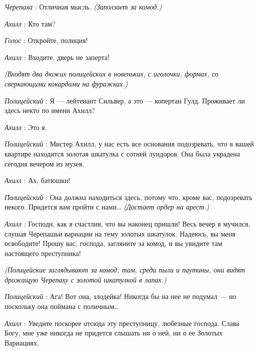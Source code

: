 \emph{Черепаха} : Отличная мысль. \emph{(Заползает за комод.)}

\emph{Ахилл} : Кто там?

\emph{Голос} : Откройте, полиция!

\emph{Ахилл} : Входите, дверь не заперта!

\emph{(Входят два дюжих полицейских в новеньких, с иголочки, формах, со сверкающими кокардами на фуражках.)}

\emph{Полицейский} : Я --- лейтенант Сильвер, а это --- копертан Гулд. Проживает ли здесь некто по имени Ахилл?

\emph{Ахилл} : Это я.

\emph{Полицейский} : Мистер Ахилл, у нас есть все основания подозревать, что в вашей квартире находится золотая шкатулка с сотней луидоров. Она была украдена сегодня вечером из музея.

\emph{Ахилл} : Ах, батюшки!

\emph{Полицейский} : Она должна находиться здесь, потому что, кроме вас, подозревать некого. Придется вам пройти с нами\ldots{} \emph{(Достает ордер на арест.)}

\emph{Ахилл} : Господи, как я счастлив, что вы наконец пришли! Весь вечер я мучился, слушая Черепашьи вариации на тему золотых шкатулок. Надеюсь, вы меня освободите! Прошу вас, господа, загляните за комод, и вы увидите там настоящего преступника!

\emph{(Полицейские заглядывают за комод; там, среди пыли и паутины, они видят дрожащую Черепаху с золотой шкатулкой в лапах.)}

\emph{Полицейский} : Ага! Вот она, злодейка! Никогда бы на нее не подумал --- но поскольку она поймана с поличным\ldots{}

\emph{Ахилл} : Уведите поскорее отсюда эту преступницу, любезные господа. Слава Богу, мне уже никогда не придется слышать ни о ней, ни о ее Золотых Вариациях.

